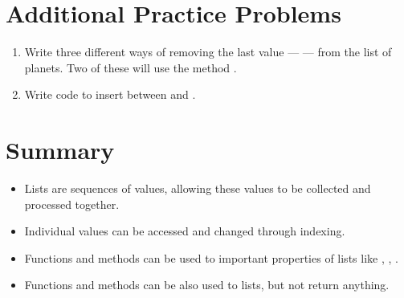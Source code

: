 \documentclass[letterpaper,10pt,english]{sphinxmanual}
\begin{document}
\section{Additional Practice Problems}
\label{\detokenize{lecture_notes/lec08_lists1:additional-practice-problems}}\begin{enumerate}
\item {} 
Write three different ways of removing the last value —  —
from the list of planets. Two of these will use the method .

\item {} 
Write code to insert  between  and
.

\end{enumerate}


\section{Summary}
\label{\detokenize{lecture_notes/lec08_lists1:summary}}\begin{itemize}
\item {} 
Lists are sequences of values, allowing these values to be collected
and processed together.

\item {} 
Individual values can be accessed and changed through indexing.

\item {} 
Functions and methods can be used to  important properties
of lists like , , .

\item {} 
Functions and methods can be also used to  lists, but not
return anything.

\end{itemize}
\end{document}
